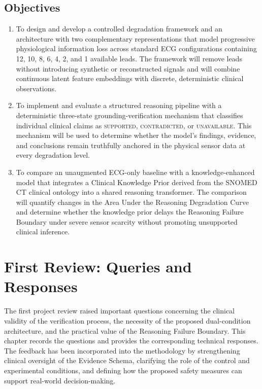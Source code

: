 \documentclass{ssnreview}
\begin{document}
\section{Objectives}
\begin{enumerate}[label=\arabic*.,leftmargin=*,align=left]
  \item To design and develop a controlled degradation framework and an architecture
  with two complementary representations that model progressive physiological information loss
  across standard ECG configurations containing 12, 10, 8, 6, 4, 2, and 1 available
  leads. The framework will remove leads without introducing synthetic or reconstructed
  signals and will combine continuous latent feature embeddings with discrete,
  deterministic clinical observations.

  \item To implement and evaluate a structured reasoning pipeline with a deterministic
  three-state grounding-verification mechanism that classifies individual clinical claims
  as \textsc{supported}, \textsc{contradicted}, or \textsc{unavailable}. This mechanism
  will be used to determine whether the model's findings, evidence, and conclusions remain
  truthfully anchored in the physical sensor data at every degradation level.

  \item To compare an unaugmented ECG-only baseline with a knowledge-enhanced model that
  integrates a Clinical Knowledge Prior derived from the SNOMED CT clinical ontology into
  a shared reasoning transformer. The comparison will quantify changes in the Area Under
  the Reasoning Degradation Curve and determine whether the knowledge prior delays the
  Reasoning Failure Boundary under severe sensor scarcity without promoting unsupported
  clinical inference.
\end{enumerate}


\chapter{First Review: Queries and Responses}

The first project review raised important questions concerning the clinical validity of the
verification process, the necessity of the proposed dual-condition architecture, and the
practical value of the Reasoning Failure Boundary. This chapter records the questions and
provides the corresponding technical responses. The feedback has been incorporated into
the methodology by strengthening clinical oversight of the Evidence Schema, clarifying the
role of the control and experimental conditions, and defining how the proposed safety
measures can support real-world decision-making.
\end{document}
